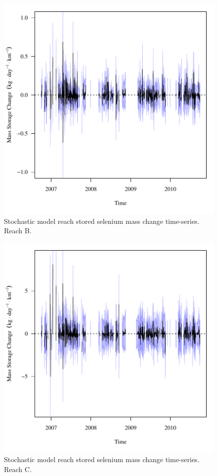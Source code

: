 \begin{figure}[htbp]
	\begin{center}
	\includegraphics[width=6in]{"Figures/Results_USR/f Segment B"}
	\caption{Stochastic model reach stored selenium mass change time-series.  Reach B.}
	\end{center}
\end{figure}

\begin{figure}[htbp]
	\begin{center}
	\includegraphics[width=6in]{"Figures/Results_USR/f Segment C"}
	\caption{Stochastic model reach stored selenium mass change time-series.  Reach C.}
	\end{center}
\end{figure}

